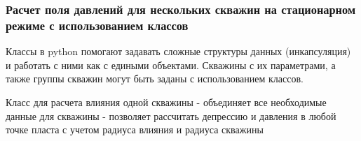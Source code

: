\documentclass[
  russian,
  letterpaper,
  DIV=11,
  numbers=noendperiod,
  oneside]{scrartcl}
\begin{document}
\subsubsection{Расчет поля давлений для нескольких скважин на
стационарном режиме с использованием
классов}\label{ux440ux430ux441ux447ux435ux442-ux43fux43eux43bux44f-ux434ux430ux432ux43bux435ux43dux438ux439-ux434ux43bux44f-ux43dux435ux441ux43aux43eux43bux44cux43aux438ux445-ux441ux43aux432ux430ux436ux438ux43d-ux43dux430-ux441ux442ux430ux446ux438ux43eux43dux430ux440ux43dux43eux43c-ux440ux435ux436ux438ux43cux435-ux441-ux438ux441ux43fux43eux43bux44cux437ux43eux432ux430ux43dux438ux435ux43c-ux43aux43bux430ux441ux441ux43eux432}

Классы в python помогают задавать сложные структуры данных
(инкапсуляция) и работать с ними как с едиными объектами. Скважины с их
параметрами, а также группы скважин могут быть заданы с использованием
классов.

Класс для расчета влияния одной скважины - объединяет все необходимые
данные для скважины - позволяет рассчитать депрессию и давления в любой
точке пласта с учетом радиуса влияния и радиуса скважины
\end{document}
